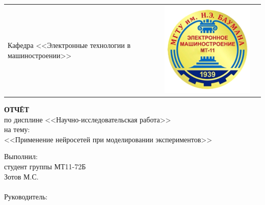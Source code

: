\documentclass[../template.tex]{subfiles}
\begin{document}
\begin{titlepage}
\begin{center}
\begin{tabular}{C{3cm}C{10cm}C{3cm}}
{		Кафедра <<Электронные технологии в машиностроении>>}&\includegraphics[width=\linewidth]{../images/titul/mt11.png}
	\end{tabular}
\end{center}
		\vspace{2em}
		\begin{center}
			{\Large \bfseries ОТЧЁТ}\\
			по дисплине
			<<Научно-исследовательская работа>>\\
			на тему:\\
			<<Применение нейросетей при моделировании экспериментов>>
		\end{center}
		\vspace{1em}
		\newbox{\lbox}
		\newlength{\maxl}
		\setlength{\maxl}{\wd\lbox}
		\hfill\parbox{11cm}
		{
			\hspace*{5cm}Выполнил:\hfill\\
			\hspace*{5cm}студент группы МТ11-72Б \hfill\\
			\hspace*{5cm}Зотов М.С.\hfill\\\\
			\hspace*{5cm}Руководитель:\hfill\\
}
\end{titlepage}
\end{document}
